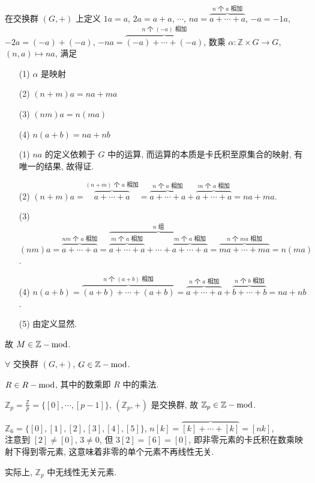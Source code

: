 \documentclass{note}
\begin{document}
\begin{eg}
    在交换群 $(G,+)$ 上定义 $1a=a$, $2a=a+a$, $\cdots$, $na=\overbrace{a+\cdots+a}^{\text{$n$ 个 $a$ 相加}}$, $-a=-1a$, $-2a=(-a)+(-a)$, $-na=\overbrace{(-a)+\cdots+(-a)}^{\text{$n$ 个 $(-a)$ 相加}}$, 数乘 $\alpha:\mathbb{Z}\times G\rightarrow G$, $(n,a)\mapsto na$, 满足
    \begin{itemize}
        \item[(1)] $\alpha$ 是映射
        \item[(2)] $(n+m)a=na+ma$
        \item[(3)] $(nm)a=n(ma)$
        \item[(4)] $n(a+b)=na+nb$
    \end{itemize}
    \begin{pf}
        \begin{itemize}
            \item[(1)] $na$ 的定义依赖于 $G$ 中的运算, 而运算的本质是卡氏积至原集合的映射, 有唯一的结果, 故得证.
            \item[(2)] $(n+m)a=\overbrace{a+\cdots+a}^{\text{$(n+m)$ 个 $a$ 相加}}=\overbrace{a+\cdots+a}^{\text{$n$ 个 $a$ 相加}}+\overbrace{a+\cdots+a}^{\text{$m$ 个 $a$ 相加}}=na+ma$.
            \item[(3)] $(nm)a=\overbrace{a+\cdots+a}^{\text{$nm$ 个 $a$ 相加}}=\overbrace{\overbrace{a+\cdots+a}^{\text{$m$ 个 $a$ 相加}}+\cdots+\overbrace{a+\cdots+a}^{\text{$m$ 个 $a$ 相加}}}^{\text{$n$ 组}}=\overbrace{ma+\cdots+ma}^{\text{$n$ 个 $ma$ 相加}}=n(ma)$.
            \item[(4)] $n(a+b)=\overbrace{(a+b)+\cdots+(a+b)}^{\text{$n$ 个 $(a+b)$ 相加}}=\overbrace{a+\cdots+a}^{\text{$n$ 个 $a$ 相加}}+\overbrace{b+\cdots+b}^{\text{$n$ 个 $b$ 相加}}=na+nb$.
            \item[(5)] 由定义显然.
        \end{itemize}
    \end{pf}
    故 $M\in\mathbb{Z}-\operatorname{mod}$.
\end{eg}

\begin{eg}
    $\forall$ 交换群 $(G,+)$, $G\in\mathbb{Z}-\operatorname{mod}$.
\end{eg}

\begin{eg}
    $R\in R-\operatorname{mod}$, 其中的数乘即 $R$ 中的乘法.
\end{eg}

\begin{eg}\label{module Zp}
    $\mathbb{Z}_p=\frac{\mathbb{Z}}{p}=\{[0],\cdots,[p-1]\}$, $(\mathbb{Z}_p,+)$ 是交换群, 故 $\mathbb{Z}_p\in\mathbb{Z}-\operatorname{mod}$.

    $\mathbb{Z}_6=\{[0],[1],[2],[3],[4],[5]\}$, $n[k]=\overbrace{[k]+\cdots+[k]}=[nk]$,\\
    注意到 $[2]\neq[0]$, $3\neq 0$, 但 $3[2]=[6]=[0]$, 即非零元素的卡氏积在数乘映射下得到零元素, 这意味着非零的单个元素不再线性无关.

    实际上, $\mathbb{Z}_p$ 中无线性无关元素.
\end{eg}
\end{document}
